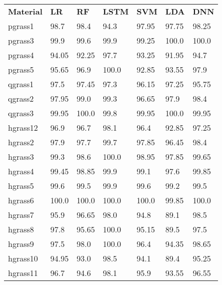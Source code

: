 \begin{table}
	\begin{center}
\begin{adjustbox}{totalheight=\baselineskip}
		\begin{tabular}{|l|l|l|l|l|l|l|}
		\hline
		\rowcolor{gray!150}
		\rule{0pt}{25pt}\color{white}\textbf{Material} & \color{white}\textbf{LR} & \color{white}\textbf{RF} & \color{white}\textbf{LSTM} & \color{white}\textbf{SVM} & \color{white}\textbf{LDA} & \color{white}\textbf{DNN}\\
		pgrass1 & 98.7 & 98.4 & \cellcolor{red!20}94.3 & 97.95 & 97.75 & 98.25\\
		pgrass3 & 99.9 & 99.6 & 99.9 & 99.25 & 100.0 & 100.0\\
		pgrass4 & \cellcolor{red!20}94.05 & \cellcolor{red!20}92.25 & 97.7 & \cellcolor{red!20}93.25 & \cellcolor{red!20}91.95 & \cellcolor{red!20}94.7\\
		pgrass5 & 95.65 & 96.9 & 100.0 & \cellcolor{red!20}92.85 & \cellcolor{red!20}93.55 & 97.9\\
		qgrass1 & 97.5 & 97.45 & 97.3 & 96.15 & 97.25 & 95.75\\
		qgrass2 & 97.95 & 99.0 & 99.3 & 96.65 & 97.9 & 98.4\\
		qgrass3 & 99.95 & 100.0 & 99.8 & 99.95 & 100.0 & 99.95\\
		hgrass12 & 96.9 & 96.7 & 98.1 & 96.4 & \cellcolor{red!20}92.85 & 97.25\\
		hgrass2 & 97.9 & 97.7 & 99.7 & 97.85 & 96.45 & 98.4\\
		hgrass3 & 99.3 & 98.6 & 100.0 & 98.95 & 97.85 & 99.65\\
		hgrass4 & 99.45 & 98.85 & 99.9 & 99.1 & 97.6 & 99.85\\
		hgrass5 & 99.6 & 99.5 & 99.9 & 99.6 & 99.2 & 99.5\\
		hgrass6 & 100.0 & 100.0 & 100.0 & 100.0 & 99.85 & 100.0\\
		hgrass7 & 95.9 & 96.65 & 98.0 & \cellcolor{red!20}94.8 & \cellcolor{red!20}89.1 & 98.5\\
		hgrass8 & 97.8 & 95.65 & 100.0 & 95.15 & \cellcolor{red!20}89.5 & 97.5\\
		hgrass9 & 97.5 & 98.0 & 100.0 & 96.4 & \cellcolor{red!20}94.35 & 98.65\\
		hgrass10 & \cellcolor{red!20}94.95 & \cellcolor{red!20}93.0 & 98.5 & \cellcolor{red!20}94.1 & \cellcolor{red!20}89.4 & 95.25\\
		hgrass11 & 96.7 & \cellcolor{red!20}94.6 & 98.1 & 95.9 & \cellcolor{red!20}93.55 & 96.55\\

\end{tabular}
\end{adjustbox}
\end{center}
\end{table}
